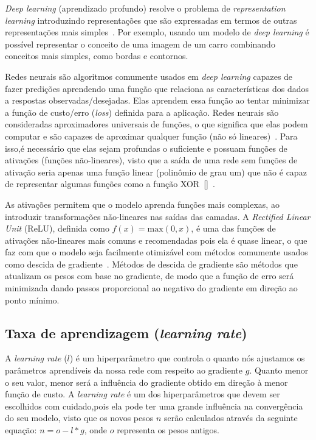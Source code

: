 \textit{Deep learning} (aprendizado profundo) resolve o problema de \textit{representation learning} introduzindo representações que são expressadas em termos de outras representações mais simples~\cite{deeplearning}. Por exemplo, usando um modelo de \textit{deep learning} é possível representar o conceito de uma imagem de um carro combinando conceitos mais simples, como bordas e contornos.

Redes neurais são algoritmos comumente usados em \textit{deep learning} capazes de fazer predições aprendendo uma função que relaciona as características dos dados a respostas observadas/desejadas. Elas aprendem essa função ao tentar minimizar a função de custo/erro (\textit{loss}) definida para a aplicação. Redes neurais são consideradas aproximadores universais de funções, o que significa que elas podem computar e são capazes de aproximar qualquer função (não só lineares)~\cite{dlbook}. Para isso,é necessário que elas sejam profundas o suficiente e possuam funções de ativações (funções não-lineares), visto que a saída de uma rede sem funções de ativação seria apenas uma função linear (polinômio de grau um) que não é capaz de representar algumas funções como a função \acrshort{XOR}~[]~\cite{deeplearning}. 

As ativações permitem que o modelo aprenda funções mais complexas, ao introduzir transformações não-lineares nas saídas das camadas. A \textit{Rectified Linear Unit} (\acrshort{ReLU}), definida como $f(x) = \text{max}(0, x)$, é uma das funções de ativações não-lineares mais comuns e recomendadas pois ela é quase linear, o que faz com que o modelo seja facilmente otimizável com métodos comumente usados como descida de gradiente~\cite{rumelhart1988learning}. Métodos de descida de gradiente são métodos que atualizam os pesos com base no gradiente, de modo que a função de erro será minimizada dando passos proporcional ao negativo do gradiente em direção ao ponto mínimo. 


\subsection{Taxa de aprendizagem (\textit{learning rate})}
A \textit{learning rate} ($l$) é um hiperparâmetro que controla o quanto nós ajustamos os parâmetros aprendíveis da nossa rede com respeito ao gradiente $g$. Quanto menor o seu valor, menor será a influência do gradiente obtido em direção à menor função de custo. A \textit{learning rate} é um dos hiperparâmetros que devem ser escolhidos com cuidado,pois ela pode ter uma grande influência na convergência do seu modelo, visto que os novos pesos $n$ serão calculados através da seguinte equação: $n = o - l*g$, onde $o$ representa os pesos antigos.

